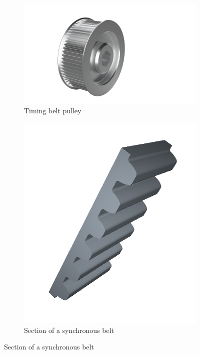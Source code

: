 \documentclass[main.tex]{subfiles}
\begin{document}
\begin{figure}[H]
            \centering
    \begin{subfigure}{0.5\textwidth}
        \includegraphics[width=\linewidth]{images/fig16}
        \caption{Timing belt pulley}
        \end{subfigure}
        
        \begin{subfigure}{0.25\textwidth}
        \includegraphics[width=\linewidth]{images/belt.png}
        \caption{Section of a synchronous belt}
        \end{subfigure}
        \label{fig:pulley}
\end{figure}
\end{document}
